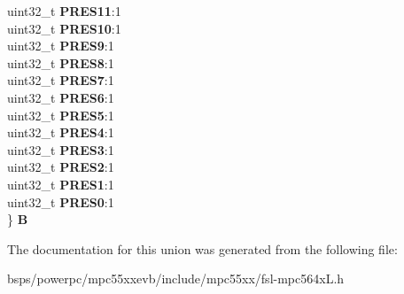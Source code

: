 \begin{DoxyCompactItemize}
\begin{tabbing}
\>uint32\_t {\bfseries PRES11}:1\\
\>uint32\_t {\bfseries PRES10}:1\\
\>uint32\_t {\bfseries PRES9}:1\\
\>uint32\_t {\bfseries PRES8}:1\\
\>uint32\_t {\bfseries PRES7}:1\\
\>uint32\_t {\bfseries PRES6}:1\\
\>uint32\_t {\bfseries PRES5}:1\\
\>uint32\_t {\bfseries PRES4}:1\\
\>uint32\_t {\bfseries PRES3}:1\\
\>uint32\_t {\bfseries PRES2}:1\\
\>uint32\_t {\bfseries PRES1}:1\\
\>uint32\_t {\bfseries PRES0}:1\\
\} {\bfseries B}\\

\end{tabbing}\end{DoxyCompactItemize}


The documentation for this union was generated from the following file\+:\begin{DoxyCompactItemize}
\item 
bsps/powerpc/mpc55xxevb/include/mpc55xx/fsl-\/mpc564x\+L.\+h\end{DoxyCompactItemize}

